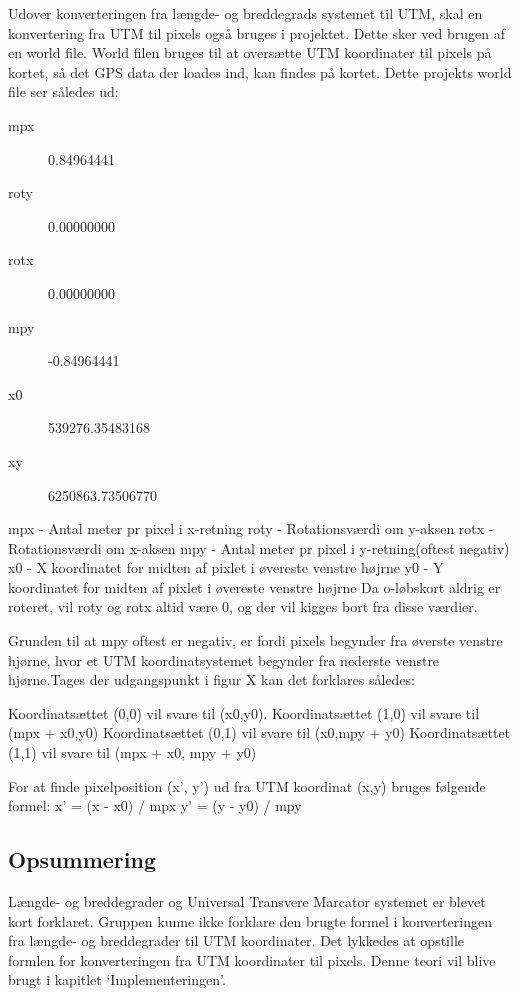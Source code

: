 Udover konverteringen fra længde- og breddegrads systemet til UTM, skal en konvertering fra UTM til pixels også bruges i projektet. Dette sker ved brugen af en world file. World filen bruges til at oversætte UTM koordinater til pixels på kortet, så det GPS data der loades ind, kan findes på kortet. Dette projekts world file ser således ud:
\begin{description}
\item[mpx] 0.84964441
\item[roty] 0.00000000
\item[rotx] 0.00000000
\item[mpy] -0.84964441
\item[x0] 539276.35483168
\item[xy] 6250863.73506770
\end{description}
mpx - Antal meter pr pixel i x-retning\newline
roty - Rotationsværdi om y-aksen\newline
rotx - Rotationsværdi om x-aksen\newline
mpy - Antal meter pr pixel i y-retning(oftest negativ)\newline
x0 - X koordinatet for midten af pixlet i øvereste venstre højrne\newline
y0 - Y koordinatet for midten af pixlet i øvereste venstre højrne\newline
Da o-løbskort aldrig er roteret, vil roty og rotx altid være 0, og der vil kigges bort fra disse værdier.

Grunden til at mpy oftest er negativ, er fordi pixels begynder fra øverste venstre hjørne, hvor et UTM koordinatsystemet begynder fra nederste venstre hjørne.Tages der udgangspunkt i figur X kan det forklares således:

Koordinatsættet (0,0) vil svare til (x0,y0).
Koordinatsættet (1,0) vil svare til (mpx + x0,y0)
Koordinatsættet (0,1) vil svare til (x0,mpy + y0)
Koordinatsættet (1,1) vil svare til (mpx + x0, mpy + y0)

For at finde pixelposition (x’, y’) ud fra UTM koordinat (x,y) bruges følgende formel:\newline
x’ = (x - x0) / mpx\newline
y’ = (y - y0) / mpy\newline

\subsection{Opsummering}
Længde- og breddegrader og Universal Transvere Marcator systemet er blevet kort forklaret. Gruppen kunne ikke forklare den brugte formel i konverteringen fra længde- og breddegrader til UTM koordinater. Det lykkedes at opstille formlen for konverteringen fra UTM koordinater til pixels. Denne teori vil blive brugt i kapitlet ‘Implementeringen’. 